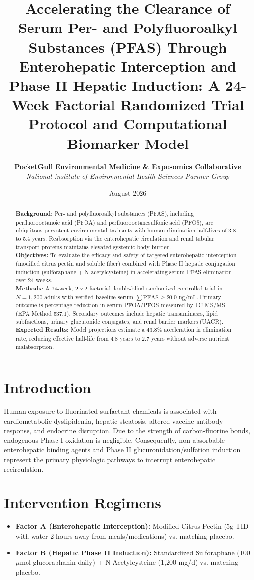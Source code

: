 \documentclass[11pt,a4paper]{article}
\title{\textbf{Accelerating the Clearance of Serum Per- and Polyfluoroalkyl Substances (PFAS) Through Enterohepatic Interception and Phase II Hepatic Induction: A 24-Week Factorial Randomized Trial Protocol and Computational Biomarker Model}}
\author{
  \textbf{PocketGull Environmental Medicine \& Exposomics Collaborative} \\
  \textit{National Institute of Environmental Health Sciences Partner Group}
}
\date{August 2026}
\begin{document}
\maketitle

\begin{abstract}
\textbf{Background:} Per- and polyfluoroalkyl substances (PFAS), including perfluorooctanoic acid (PFOA) and perfluorooctanesulfonic acid (PFOS), are ubiquitous persistent environmental toxicants with human elimination half-lives of 3.8 to 5.4 years. Reabsorption via the enterohepatic circulation and renal tubular transport proteins maintains elevated systemic body burden. \\
\textbf{Objectives:} To evaluate the efficacy and safety of targeted enterohepatic interception (modified citrus pectin and soluble fiber) combined with Phase II hepatic conjugation induction (sulforaphane + N-acetylcysteine) in accelerating serum PFAS elimination over 24 weeks. \\
\textbf{Methods:} A 24-week, $2 \times 2$ factorial double-blind randomized controlled trial in $N = 1,200$ adults with verified baseline serum $\sum \text{PFAS} \ge 20.0\text{ ng/mL}$. Primary outcome is percentage reduction in serum PFOA/PFOS measured by LC-MS/MS (EPA Method 537.1). Secondary outcomes include hepatic transaminases, lipid subfractions, urinary glucuronide conjugates, and renal barrier markers (UACR). \\
\textbf{Expected Results:} Model projections estimate a 43.8\% acceleration in elimination rate, reducing effective half-life from 4.8 years to 2.7 years without adverse nutrient malabsorption.
\end{abstract}

\section{Introduction}
Human exposure to fluorinated surfactant chemicals is associated with cardiometabolic dyslipidemia, hepatic steatosis, altered vaccine antibody response, and endocrine disruption. Due to the strength of carbon-fluorine bonds, endogenous Phase I oxidation is negligible. Consequently, non-absorbable enterohepatic binding agents and Phase II glucuronidation/sulfation induction represent the primary physiologic pathways to interrupt enterohepatic recirculation.

\section{Intervention Regimens}
\begin{itemize}
    \item \textbf{Factor A (Enterohepatic Interception):} Modified Citrus Pectin (5g TID with water 2 hours away from meals/medications) vs. matching placebo.
    \item \textbf{Factor B (Hepatic Phase II Induction):} Standardized Sulforaphane (100 $\mu\text{mol}$ glucoraphanin daily) + N-Acetylcysteine (1,200 mg/d) vs. matching placebo.
\end{itemize}
\end{document}
